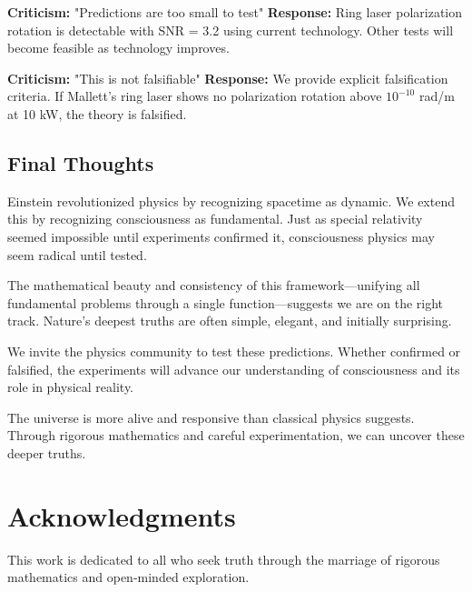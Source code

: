 \documentclass[11pt]{article}
\theoremstyle{definition}
\begin{document}
\textbf{Criticism:} "Predictions are too small to test"
\textbf{Response:} Ring laser polarization rotation is detectable with SNR = 3.2 using current technology. Other tests will become feasible as technology improves.

\textbf{Criticism:} "This is not falsifiable"
\textbf{Response:} We provide explicit falsification criteria. If Mallett's ring laser shows no polarization rotation above $10^{-10}$ rad/m at 10 kW, the theory is falsified.

\subsection{Final Thoughts}

Einstein revolutionized physics by recognizing spacetime as dynamic. We extend this by recognizing consciousness as fundamental. Just as special relativity seemed impossible until experiments confirmed it, consciousness physics may seem radical until tested.

The mathematical beauty and consistency of this framework—unifying all fundamental problems through a single function—suggests we are on the right track. Nature's deepest truths are often simple, elegant, and initially surprising.

We invite the physics community to test these predictions. Whether confirmed or falsified, the experiments will advance our understanding of consciousness and its role in physical reality.

The universe is more alive and responsive than classical physics suggests. Through rigorous mathematics and careful experimentation, we can uncover these deeper truths.

\section*{Acknowledgments}

This work is dedicated to all who seek truth through the marriage of rigorous mathematics and open-minded exploration.
\end{document}
